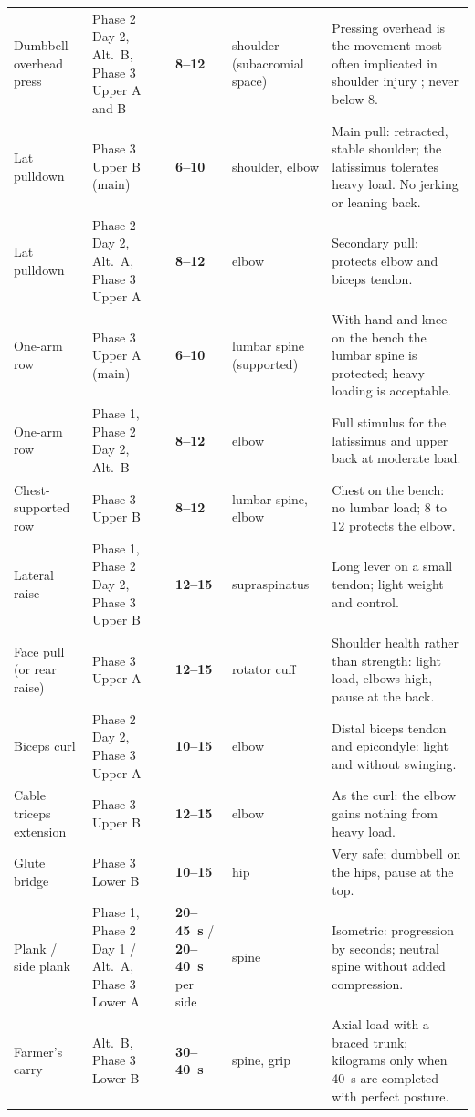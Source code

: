 \documentclass[11pt,a4paper]{article}
\newcommand{\rng}[1]{\textbf{#1}}
\begin{document}
\begin{longtable}{L{3.0cm} L{3.0cm} L{2.1cm} L{2.1cm} L{5.0cm}}
Dumbbell overhead press & Phase 2 Day 2, Alt.\ B, Phase 3 Upper A and B & \rng{8--12} & shoulder (subacromial space) & Pressing overhead is the movement most often implicated in shoulder injury \citep{kolber2010}; never below 8. \\
Lat pulldown & Phase 3 Upper B (main) & \rng{6--10} & shoulder, elbow & Main pull: retracted, stable shoulder; the latissimus tolerates heavy load. No jerking or leaning back. \\
Lat pulldown & Phase 2 Day 2, Alt.\ A, Phase 3 Upper A & \rng{8--12} & elbow & Secondary pull: protects elbow and biceps tendon. \\
One-arm row & Phase 3 Upper A (main) & \rng{6--10} & lumbar spine (supported) & With hand and knee on the bench the lumbar spine is protected; heavy loading is acceptable. \\
One-arm row & Phase 1, Phase 2 Day 2, Alt.\ B & \rng{8--12} & elbow & Full stimulus for the latissimus and upper back at moderate load. \\
Chest-supported row & Phase 3 Upper B & \rng{8--12} & lumbar spine, elbow & Chest on the bench: no lumbar load; 8 to 12 protects the elbow. \\
Lateral raise & Phase 1, Phase 2 Day 2, Phase 3 Upper B & \rng{12--15} & supra\-spinatus & Long lever on a small tendon; light weight and control. \\
Face pull (or rear raise) & Phase 3 Upper A & \rng{12--15} & rotator cuff & Shoulder health rather than strength: light load, elbows high, pause at the back. \\
Biceps curl & Phase 2 Day 2, Phase 3 Upper A & \rng{10--15} & elbow & Distal biceps tendon and epicondyle: light and without swinging. \\
Cable triceps extension & Phase 3 Upper B & \rng{12--15} & elbow & As the curl: the elbow gains nothing from heavy load. \\
Glute bridge & Phase 3 Lower B & \rng{10--15} & hip & Very safe; dumbbell on the hips, pause at the top. \\
Plank / side plank & Phase 1, Phase 2 Day 1 / Alt.\ A, Phase 3 Lower A & \rng{20--45~s} / \rng{20--40~s} per side & spine & Isometric: progression by seconds; neutral spine without added compression. \\
Farmer's carry & Alt.\ B, Phase 3 Lower B & \rng{30--40~s} & spine, grip & Axial load with a braced trunk; kilograms only when 40~s are completed with perfect posture. \\
\end{longtable}
\end{document}
